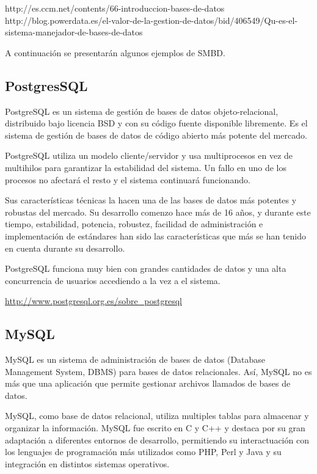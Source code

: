 http://es.ccm.net/contents/66-introduccion-bases-de-datos
http://blog.powerdata.es/el-valor-de-la-gestion-de-datos/bid/406549/Qu-es-el-sistema-manejador-de-bases-de-datos

A continuación se presentarán algunos ejemplos de SMBD.

\subsection {PostgresSQL}

PostgreSQL es un sistema de gestión de bases de datos objeto-relacional, distribuido bajo licencia BSD y con su código fuente disponible libremente. Es el sistema de gestión de bases de datos de código abierto más potente del mercado.

PostgreSQL utiliza un modelo cliente/servidor y usa multiprocesos en vez de multihilos para garantizar la estabilidad del sistema. Un fallo en uno de los procesos no afectará el resto y el sistema continuará funcionando.

Sus características técnicas la hacen una de las bases de datos más potentes y robustas del mercado. Su desarrollo comenzo hace más de 16 años, y durante este tiempo, estabilidad, potencia, robustez, facilidad de administración e implementación de estándares han sido las características que más se han tenido en cuenta durante su desarrollo.

PostgreSQL funciona muy bien con grandes cantidades de datos y una alta concurrencia de usuarios accediendo a la vez a el sistema.
 
\url{http://www.postgresql.org.es/sobre_postgresql}

\subsection{MySQL}

MySQL es un sistema de administración de bases de datos (Database Management System, DBMS) para bases de datos relacionales. Así, MySQL no es más que una aplicación que permite gestionar archivos llamados de bases de datos.

MySQL, como base de datos relacional, utiliza multiples tablas para almacenar y organizar la información. MySQL fue escrito en C y C++ y destaca por su gran adaptación a diferentes entornos de desarrollo, permitiendo su interactuación con los lenguajes de programación más utilizados como PHP, Perl y Java y su integración en distintos sistemas operativos.

